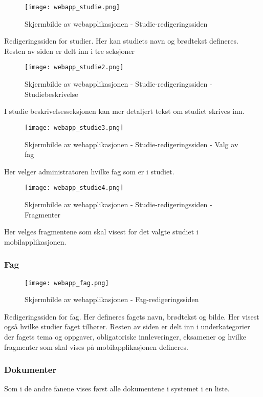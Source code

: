 \documentclass[../main.tex]{subfiles}
\begin{document}
\begin{figure}[H]
  \centering
  \texttt{[image: webapp\_studie.png]}
  \caption{Skjermbilde av webapplikasjonen - Studie-redigeringssiden}
\end{figure}

Redigeringssiden for studier. Her kan studiets navn og brødtekst defineres. Resten av siden er delt inn i tre seksjoner

\begin{figure}[H]
  \centering
  \texttt{[image: webapp\_studie2.png]}
  \caption{Skjermbilde av webapplikasjonen - Studie-redigeringssiden - Studiebeskrivelse}
\end{figure}

I studie beskrivelsesseksjonen kan mer detaljert tekst om studiet skrives inn.

\begin{figure}[H]
  \centering
  \texttt{[image: webapp\_studie3.png]}
  \caption{Skjermbilde av webapplikasjonen - Studie-redigeringssiden - Valg av fag}
\end{figure}

Her velger administratoren hvilke fag som er i studiet.

\begin{figure}[H]
  \centering
  \texttt{[image: webapp\_studie4.png]}
  \caption{Skjermbilde av webapplikasjonen - Studie-redigeringssiden - Fragmenter}
\end{figure}

Her velges fragmentene som skal visest for det valgte studiet i mobilapplikasjonen.

\subsubsection{Fag}

\begin{figure}[H]
  \centering
  \texttt{[image: webapp\_fag.png]}
  \caption{Skjermbilde av webapplikasjonen - Fag-redigeringssiden}
\end{figure}

Redigeringssiden for fag. Her defineres fagets navn, brødtekst og bilde. Her visest også hvilke studier faget tilhører. Resten av siden er delt inn i underkategorier der fagets tema og oppgaver, obligatoriske innleveringer, eksamener og hvilke fragmenter som skal vises på mobilapplikasjonen defineres.

\subsubsection{Dokumenter}
Som i de andre fanene vises først alle dokumentene i systemet i en liste.
\end{document}
